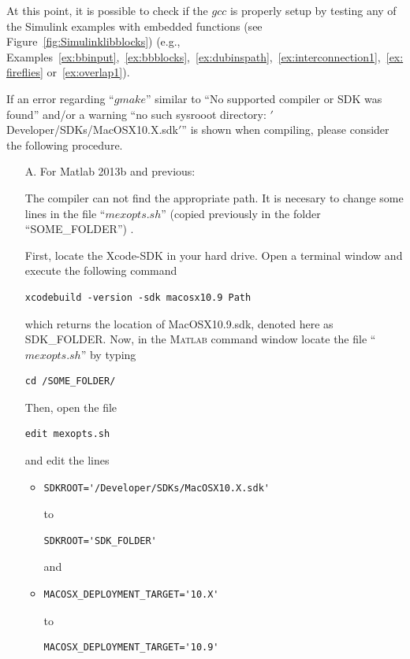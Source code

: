 \documentclass{article}
\newcommand{\matlab}{\textsc{Matlab}}
\begin{document}
At this point, it is possible to check if the $gcc$ is properly setup by testing any of the Simulink examples with embedded functions (see Figure~\ref{fig:Simulinklibblocks}) (e.g., Examples~\ref{ex:bbinput},~\ref{ex:bbblocks},~\ref{ex:dubinspath},~\ref{ex:interconnection1},~\ref{ex:fireflies} or~\ref{ex:overlap1}).

If an error regarding ``$gmake$'' similar to ``No supported compiler or SDK was found'' and/or a warning ``no such sysrooot directory: $'$Developer/SDKs/MacOSX10.X.sdk$'$'' is shown when compiling, please consider the following procedure.

\begin{itemize}
\item[A.] For Matlab 2013b and previous:

The compiler can not find the appropriate path. It is necesary to change some lines in the file ``$mexopts.sh$'' (copied previously in the folder ``SOME\_FOLDER'') .

First, locate the Xcode-SDK in your hard drive. Open a terminal window and execute the following command
\begin{verbatim}
xcodebuild -version -sdk macosx10.9 Path
\end{verbatim}
which returns the location of MacOSX10.9.sdk, denoted here as SDK\_FOLDER. Now, in the \matlab{} command window locate the file ``$mexopts.sh$'' by typing 
\begin{verbatim}
cd /SOME_FOLDER/
\end{verbatim}
Then, open the file 
\begin{verbatim}
edit mexopts.sh
\end{verbatim}
and edit the lines
\begin{itemize}
\item
\begin{verbatim}
SDKROOT='/Developer/SDKs/MacOSX10.X.sdk'
\end{verbatim}
to 
\begin{verbatim}
SDKROOT='SDK_FOLDER'
\end{verbatim}
and
\item
\begin{verbatim}
MACOSX_DEPLOYMENT_TARGET='10.X'
\end{verbatim}
to 
\begin{verbatim}
MACOSX_DEPLOYMENT_TARGET='10.9'
\end{verbatim}
\end{itemize}


\end{itemize}
\end{document}
